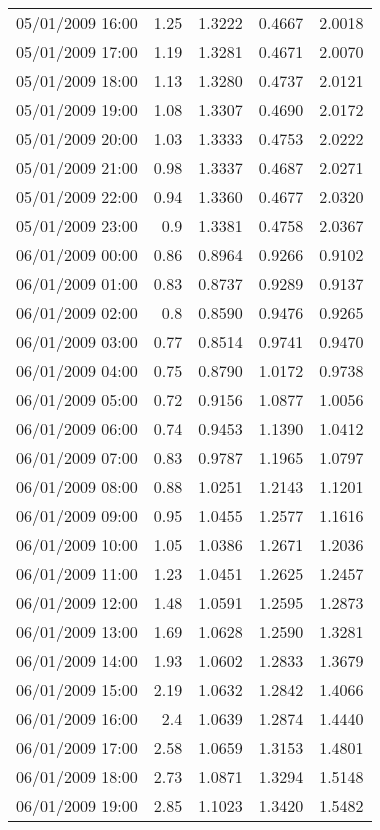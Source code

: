 \begin{longtable}{|l|r|r|r|r|}
05/01/2009 16:00 & 1.25 & 1.3222 & 0.4667 & 2.0018 \\
05/01/2009 17:00 & 1.19 & 1.3281 & 0.4671 & 2.0070 \\
05/01/2009 18:00 & 1.13 & 1.3280 & 0.4737 & 2.0121 \\
05/01/2009 19:00 & 1.08 & 1.3307 & 0.4690 & 2.0172 \\
05/01/2009 20:00 & 1.03 & 1.3333 & 0.4753 & 2.0222 \\
05/01/2009 21:00 & 0.98 & 1.3337 & 0.4687 & 2.0271 \\
05/01/2009 22:00 & 0.94 & 1.3360 & 0.4677 & 2.0320 \\
05/01/2009 23:00 & 0.9 & 1.3381 & 0.4758 & 2.0367 \\
06/01/2009 00:00 & 0.86 & 0.8964 & 0.9266 & 0.9102 \\
06/01/2009 01:00 & 0.83 & 0.8737 & 0.9289 & 0.9137 \\
06/01/2009 02:00 & 0.8 & 0.8590 & 0.9476 & 0.9265 \\
06/01/2009 03:00 & 0.77 & 0.8514 & 0.9741 & 0.9470 \\
06/01/2009 04:00 & 0.75 & 0.8790 & 1.0172 & 0.9738 \\
06/01/2009 05:00 & 0.72 & 0.9156 & 1.0877 & 1.0056 \\
06/01/2009 06:00 & 0.74 & 0.9453 & 1.1390 & 1.0412 \\
06/01/2009 07:00 & 0.83 & 0.9787 & 1.1965 & 1.0797 \\
06/01/2009 08:00 & 0.88 & 1.0251 & 1.2143 & 1.1201 \\
06/01/2009 09:00 & 0.95 & 1.0455 & 1.2577 & 1.1616 \\
06/01/2009 10:00 & 1.05 & 1.0386 & 1.2671 & 1.2036 \\
06/01/2009 11:00 & 1.23 & 1.0451 & 1.2625 & 1.2457 \\
06/01/2009 12:00 & 1.48 & 1.0591 & 1.2595 & 1.2873 \\
06/01/2009 13:00 & 1.69 & 1.0628 & 1.2590 & 1.3281 \\
06/01/2009 14:00 & 1.93 & 1.0602 & 1.2833 & 1.3679 \\
06/01/2009 15:00 & 2.19 & 1.0632 & 1.2842 & 1.4066 \\
06/01/2009 16:00 & 2.4 & 1.0639 & 1.2874 & 1.4440 \\
06/01/2009 17:00 & 2.58 & 1.0659 & 1.3153 & 1.4801 \\
06/01/2009 18:00 & 2.73 & 1.0871 & 1.3294 & 1.5148 \\
06/01/2009 19:00 & 2.85 & 1.1023 & 1.3420 & 1.5482 \\

\end{longtable}
